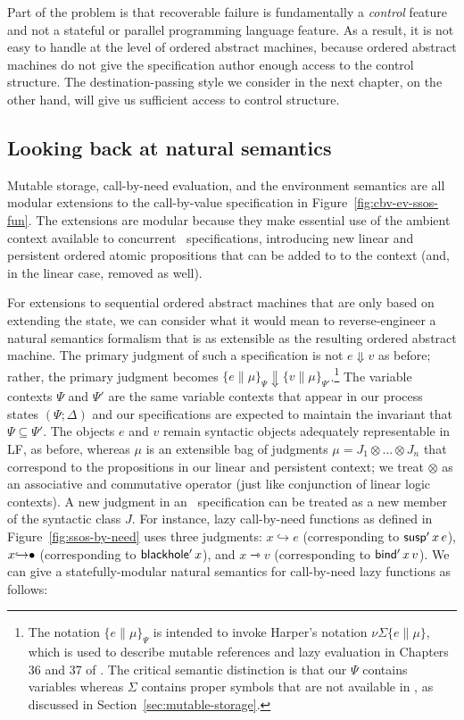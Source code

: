 Part of the problem is that recoverable failure is fundamentally a
{\it control} feature and not a stateful or parallel programming
language feature. As a result, it is not easy to handle at the level
of ordered abstract machines, because ordered abstract machines do not
give the specification author enough access to the control
structure. The destination-passing style we consider in the next
chapter, on the other hand, 
will give us sufficient access to control structure.


\subsection{Looking back at natural semantics}
\label{sec:enriching-natsem}

Mutable storage, call-by-need evaluation, and the environment
semantics are all modular extensions to the call-by-value specification in
Figure~\ref{fig:cbv-ev-ssos-fun}.  The
extensions are modular because they make essential use of the ambient
context available to concurrent \sls~specifications, introducing new
linear and persistent ordered atomic propositions that can be added to
to the context (and, in the linear case, removed as well).

For extensions to sequential ordered abstract machines that are only
based on extending the state, we can consider what it would mean to
reverse-engineer a natural semantics formalism that is as extensible
as the resulting ordered abstract machine. The primary judgment of
such a specification is not $e \Downarrow v$ as before; rather, the
primary judgment becomes $\{ e \| \mu \}_\Psi \Downarrow \{ v \| \mu
\}_{\Psi'}$.\footnote{The notation $\{ e \| \mu \}_\Psi$ is intended
  to invoke Harper's notation $\nu \Sigma \{ e \| \mu \}$, which is
  used to describe mutable references and lazy evaluation in Chapters
  36 and 37 of \cite{harper12practical}. The critical semantic
  distinction is that our $\Psi$ contains variables whereas $\Sigma$
  contains proper symbols that are not available in \sls, as discussed
  in Section~\ref{sec:mutable-storage}.} The variable contexts $\Psi$
and $\Psi'$ are the same variable contexts that appear in our process
states $(\Psi; \Delta)$ and our specifications are expected to
maintain the invariant that $\Psi \subseteq \Psi'$. The objects $e$
and $v$ remain syntactic objects adequately representable in LF, as
before, whereas $\mu$ is an extensible bag of judgments $\mu = J_1
\otimes \ldots \otimes J_n$ that correspond to the propositions in our
linear and persistent context; we treat $\otimes$ as an associative
and commutative operator (just like conjunction
of linear logic contexts).  A
new judgment in an \sls~specification 
can be treated as a new member of the syntactic class $J$.  For
instance, lazy call-by-need functions as defined in
Figure~\ref{fig:ssos-by-need} uses three judgments:
$x{\hookrightarrow}e$ (corresponding to ${\sf susp'}\,x\,e$),
$x{\hookrightarrow}{\mathbin{\bullet}}$ (corresponding to ${\sf blackhole'}\,x$),
and $x{\rightarrowtriangle}v$ (corresponding to ${\sf bind'}\,x\,v$).
We can give a statefully-modular natural semantics for call-by-need
lazy functions as follows:

